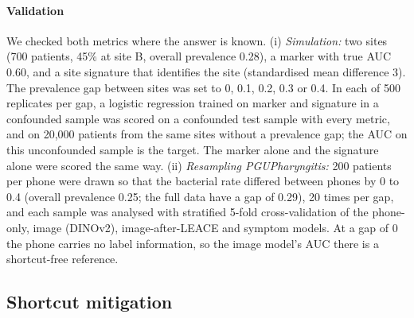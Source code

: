 \documentclass[preprint,12pt]{elsarticle}
\begin{document}
\paragraph{Validation} We checked both metrics where the answer is known. (i) \textit{Simulation:} two sites (700 patients, 45\% at site B, overall prevalence 0.28), a marker with true AUC 0.60, and a site signature that identifies the site (standardised mean difference 3). The prevalence gap between sites was set to 0, 0.1, 0.2, 0.3 or 0.4. In each of 500 replicates per gap, a logistic regression trained on marker and signature in a confounded sample was scored on a confounded test sample with every metric, and on 20,000 patients from the same sites without a prevalence gap; the AUC on this unconfounded sample is the target. The marker alone and the signature alone were scored the same way. (ii) \textit{Resampling PGUPharyngitis:} 200 patients per phone were drawn so that the bacterial rate differed between phones by 0 to 0.4 (overall prevalence 0.25; the full data have a gap of 0.29), 20 times per gap, and each sample was analysed with stratified 5-fold cross-validation of the phone-only, image (DINOv2), image-after-LEACE and symptom models. At a gap of 0 the phone carries no label information, so the image model's AUC there is a shortcut-free reference.

\subsection{Shortcut mitigation}
\label{sec:mitigation}
\end{document}
